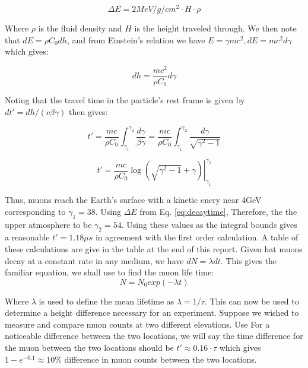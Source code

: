 \documentclass[12pt,twocolumn]{article}
\begin{document}
\begin{equation}
	\label{eq:decaytime}
	\Delta E = 2 MeV/g/cm^{2} \cdot H \cdot \rho
\end{equation}

Where $\rho$ is the fluid density and $H$ is the height traveled through. We then note that
$dE=\rho C_{0} dh$, and from Einstein's relation we have $E=\gamma mc^{2}, dE=mc^{2}d\gamma$
which gives:

\begin{equation}
	dh = \frac{mc^{2}}{\rho C_{0}} d\gamma
\end{equation}

Noting that the travel time in the particle's rest frame is given by $dt'=dh / \left( c\beta\gamma \right)$
then gives:

\begin{equation}
	t' = \frac{mc}{\rho C_{0}} \int_{\gamma_{1}}^{\gamma_{2}} \frac{ d\gamma }{ \beta\gamma } = \frac{mc}{\rho C_{0}} \int_{\gamma_{1}}^{\gamma_{2}} \frac{ d\gamma }{ \sqrt{ \gamma^{2}-1 } }
\end{equation}


\begin{equation}
	t' = \frac{mc}{\rho C_{0}} \left.\log\left(\sqrt{\gamma^{2}-1}+\gamma\right)\right|_{\gamma_{1}}^{\gamma_{2}}
\end{equation}

Thus, muons reach the Earth's surface with a kinetic enery near 4GeV corresponding to $\gamma_{1}=38$. Using $\Delta E$ from Eq. \ref{eq:decaytime}, Therefore, the the upper atmosphere to be $\gamma_{2}=54.$ Using these values as the integral bounds gives a reasonable $t'=1.18\mu s$ in agreement with  the first order calculation.  A table of these calculations are give in the table at the end of this report.
 Given hat muons decay at a constant rate in any medium, we have $dN=\lambda dt$. This gives the familiar
 equation, we shall use to find the muon life time:
 \begin{equation}
	 \label{eq:probability}
	 N=N_{0}exp(-\lambda t)
 \end{equation}
 
 Where $\lambda$ is used to define the mean lifetime as $\lambda=1/\tau$.  This can 
 now be used to determine a height difference necessary for an experiment. Suppose we wished to measure and
 compare muon counts at two different elevations. Use For a noticeable difference between the two locations, we will say
 the time difference for the muon between the two locations should be $t'\approx 0.16\cdot\tau$ which gives $1-e^{-0.1}\approx10\%$ difference in muon counts between the two locations.
\end{document}

